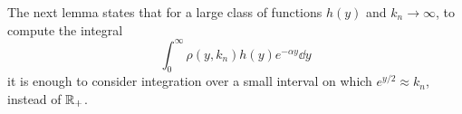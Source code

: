 



The next lemma states that for a large class of functions $h(y)$ and $k_n \to \infty$, to compute the integral 
\[
	\int_{0}^\infty \rho(y,k_n) h(y) e^{-\alpha y} \dd y
\]
it is enough to consider integration over a small interval on which $e^{y/2} \approx k_n$, instead of ${\mathbb R}_+$. 

